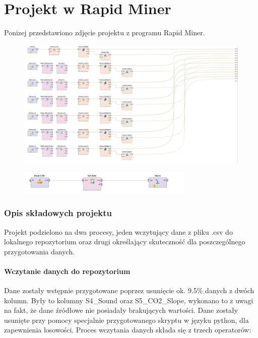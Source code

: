 \documentclass[12pt,oneside,a4paper]{book} %
\theoremstyle{break}
\begin{document}
\chapter*{Projekt w Rapid Miner}

Ponizej przedstawiono zdjęcie projektu z programu Rapid Miner.

\begin{figure}[H]
  \centering
  \includegraphics[width=1\textwidth]{whole-project.png}
\end{figure}
\begin{figure}[H]
  \centering
  \includegraphics[width=0.75\textwidth]{loading-project.png}
\end{figure}

\subsection*{Opis składowych projektu}

Projekt podzielono na dwa procesy, jeden wczytujący dane z pliku .csv do lokalnego repozytorium oraz drugi określający skuteczność dla poszczególnego przygotowania danych.

\subsubsection*{Wczytanie danych do repozytorium}

Dane zostały wstępnie przygotowane poprzez usunięcie ok. 9.5\% danych z dwóch kolumn.
Były to kolumny S4\_Sound oraz S5\_CO2\_Slope, wykonano to z uwagi na fakt, że dane źródłowe nie posiadały brakujących wartości. Dane zostały usunięte przy pomocy specjalnie przygotowanego skryptu w języku python, dla zapewnienia losowości.
\newpage
Proces wczytania danych składa się z trzech operatorów:
\end{document}
